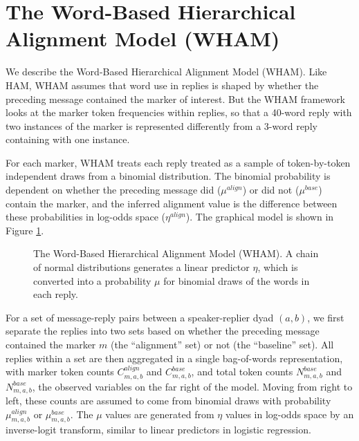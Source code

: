 \documentclass[11pt]{article}
\begin{document}
\section{The Word-Based Hierarchical Alignment Model (WHAM)}


We describe the Word-Based Hierarchical Alignment Model (WHAM). Like HAM, WHAM  assumes that word use in replies is shaped by whether the preceding message contained the marker of interest. But the WHAM framework looks at the marker token frequencies within  replies, so that a 40-word reply with two instances of the marker is represented differently from a 3-word reply containing with one instance.

For each marker, WHAM treats each reply treated as a sample of token-by-token independent draws from a binomial distribution. The binomial probability is dependent on whether the preceding message did ($\mu^{align}$) or did not ($\mu^{base}$) contain the marker, and the inferred alignment value is the difference between these probabilities in log-odds space ($\eta^{align}$). The graphical model is shown in Figure \ref{fig:wham}.

\begin{figure}[t]
  \begin{center}
    
  \end{center}
  \caption{The Word-Based Hierarchical Alignment Model (WHAM). A chain of normal distributions generates a linear predictor $\eta$, which is converted into a probability $\mu$ for binomial draws of the words in each reply.}\label{fig:wham}
\end{figure}

For a set of message-reply pairs between a speaker-replier dyad $(a,b)$, we first separate the replies into two sets based on whether the preceding message contained the marker $m$ (the ``alignment'' set) or not (the ``baseline'' set). All replies within a set are then aggregated in a single bag-of-words representation, with marker token counts $C^{align}_{m,a,b}$ and $C^{base}_{m,a,b}$, and total token counts $N^{base}_{m,a,b}$ and $N^{base}_{m,a,b}$, the observed variables on the far right of the model.  Moving from right to left, these counts are assumed to come from binomial draws with probability $\mu^{align}_{m,a,b}$ or $\mu^{base}_{m,a,b}$.  The $\mu$ values are generated from $\eta$ values in log-odds space by an inverse-logit transform, similar to linear predictors in logistic regression.
\end{document}
